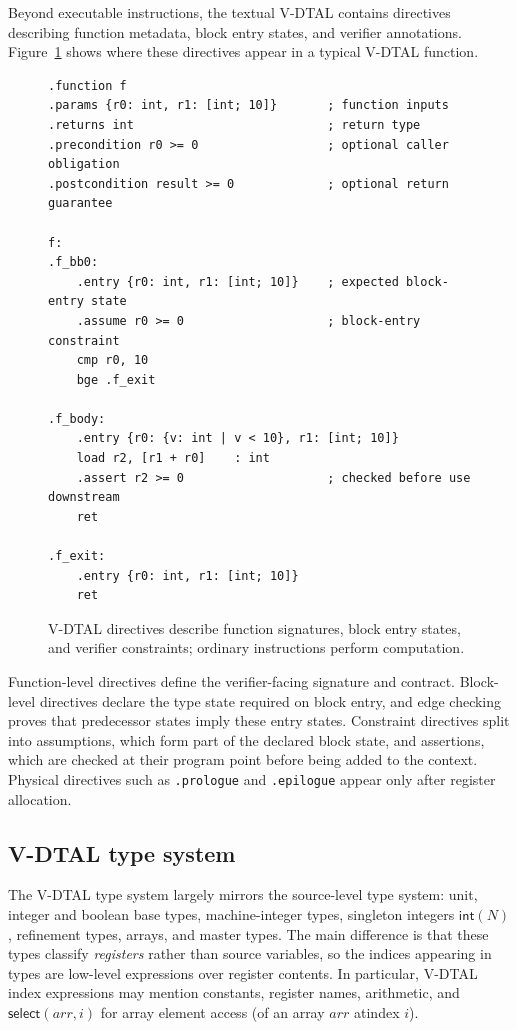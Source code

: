 Beyond executable instructions, the textual V-DTAL contains directives describing function metadata, block entry states, and verifier annotations. Figure~\ref{fig:dtal-directives} shows where these directives appear in a typical V-DTAL function.

\begin{figure}[H]
\centering
\footnotesize
\begin{verbatim}
.function f
.params {r0: int, r1: [int; 10]}       ; function inputs
.returns int                           ; return type
.precondition r0 >= 0                  ; optional caller obligation
.postcondition result >= 0             ; optional return guarantee

f:
.f_bb0:
    .entry {r0: int, r1: [int; 10]}    ; expected block-entry state
    .assume r0 >= 0                    ; block-entry constraint
    cmp r0, 10
    bge .f_exit

.f_body:
    .entry {r0: {v: int | v < 10}, r1: [int; 10]}
    load r2, [r1 + r0]    : int
    .assert r2 >= 0                    ; checked before use downstream
    ret

.f_exit:
    .entry {r0: int, r1: [int; 10]}
    ret
\end{verbatim}
\caption{V-DTAL directives describe function signatures, block entry states, and verifier constraints; ordinary instructions perform computation.}
\label{fig:dtal-directives}
\end{figure}

Function-level directives define the verifier-facing signature and contract. Block-level directives declare the type state required on block entry, and edge checking proves that predecessor states imply these entry states. Constraint directives split into assumptions, which form part of the declared block state, and assertions, which are checked at their program point before being added to the context. Physical directives such as \texttt{.prologue} and \texttt{.epilogue} appear only after register allocation.

\subsection{V-DTAL type system}

The V-DTAL type system largely mirrors the source-level type system: unit, integer and boolean base types, machine-integer types, singleton integers $\textsf{int}(N)$, refinement types, arrays, and master types. The main difference is that these types classify \emph{registers} rather than source variables, so the indices appearing in types are low-level expressions over register contents. In particular, V-DTAL index expressions may mention constants, register names, arithmetic, and $\textsf{select}(\mathit{arr}, i)$ for array element access (of an array $\mathit{arr}$ atindex $i$).

